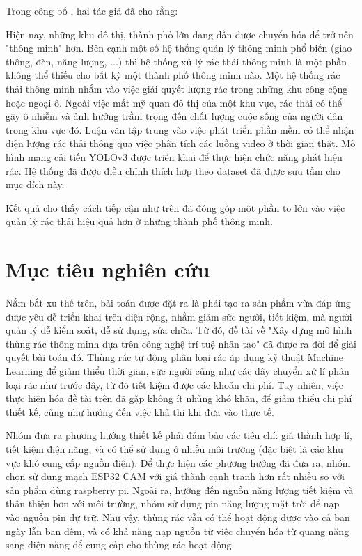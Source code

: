Trong công bố  \cite{smartcity}, hai tác giả đã cho rằng:

Hiện nay, những khu đô thị, thành phố lớn đang dần được chuyển hóa để trở nên "thông minh" hơn. Bên cạnh một số hệ thống quản lý thông minh phổ biến (giao thông, đèn, năng lượng, ...) thì hệ thống xử lý rác thải thông minh là một phần không thể thiếu cho bất kỳ một thành phố thông minh nào. 
Một hệ thống rác thải thông minh nhắm vào việc giải quyết lượng rác trong những khu công cộng hoặc ngoại ô. Ngoài việc mất mỹ quan đô thị của một khu vực, rác thải có thể gây ô nhiễm và ảnh hưởng trầm trọng đến chất lượng cuộc sống của người dân trong khu vực đó. Luận văn tập trung vào việc phát triển phần mềm có thể nhận diện lượng rác thải thông qua việc phân tích các luồng video ở thời gian thật. Mô hình mạng cải tiến YOLOv3 được triển khai để thực hiện chức năng phát hiện rác. Hệ thống đã được điều chỉnh thích hợp theo dataset đã được sưu tầm cho mục đích này.  

Kết quả cho thấy cách tiếp cận như trên đã đóng góp một phần to lớn vào việc quản lý rác thải hiệu quả hơn ở những thành phố thông minh.

\section{Mục tiêu nghiên cứu}
Nắm bắt xu thế trên, bài toán được đặt ra là phải tạo ra sản phẩm vừa đáp ứng được yêu dễ triển khai trên diện rộng, nhằm giảm sức người, tiết kiệm, mà người quản lý dễ kiểm soát, dễ sử dụng, sửa chữa.
Từ đó, đề tài về "Xây dựng mô hình thùng rác thông minh dựa trên công nghệ trí tuệ nhân tạo" đã được ra đời để giải quyết bài toán đó. 
Thùng rác tự động phân loại rác áp dụng kỹ thuật Machine Learning để giảm thiểu thời gian, sức người cũng như các dây chuyển xử lí phân loại rác như trước đây, từ đó tiết kiệm được các khoản chi phí.
Tuy nhiên, việc thực hiện hóa đề tài trên đã gặp không ít nhũng khó khăn, để giảm thiểu chi phí thiết kế, cũng như hướng đến việc khả thi khi đưa vào thực tế.

Nhóm đưa ra phương hướng thiết kế phải đảm bảo các tiêu chí: giá thành hợp lí, tiết kiệm điện năng, và có thể sử dụng ở nhiều môi trường (đặc biệt là các khu vực khó cung cấp nguồn điện).
Để thực hiện các phương hướng đã đưa ra, nhóm chọn sử dụng mạch ESP32 CAM với giá thành cạnh tranh hơn rất nhiều so với sản phẩm dùng raspberry pi.
Ngoài ra, hướng đến nguồn năng lượng tiết kiệm và thân thiện hơn với môi trường, nhóm sử dụng pin năng lượng mặt trời để nạp vào nguồn pin dự trữ.
Như vậy, thùng rác vẫn có thể hoạt động được vào cả ban ngày lẫn ban đêm, và có khả năng nạp nguồn từ việc chuyển hóa từ quang năng sang điện năng để cung cấp cho thùng rác hoạt động.

